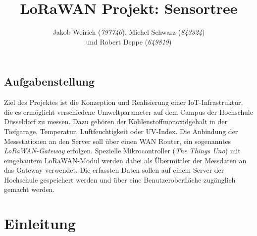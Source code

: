 \documentclass{article}
\title{LoRaWAN Projekt: Sensortree}
\author{Jakob Weirich (\textit{797740}), Michel Schwarz (\textit{843324}) \\und Robert Deppe (\textit{649819})}
\begin{document}
\setlength{\parindent}{0cm} %
\onehalfspacing
\maketitle
\newpage

\tableofcontents
\newpage

\subsection*{Aufgabenstellung}
Ziel des Projektes ist die Konzeption und Realisierung einer IoT-Infrastruktur, die es ermöglicht verschiedene Umweltparameter auf dem Campus der Hochschule Düsseldorf zu messen.
Dazu gehören der Kohlenstoffmonoxidgehalt in der Tiefgarage, Temperatur, Luftfeuchtigkeit oder UV-Index.
Die Anbindung der Messstationen an den Server soll über einen WAN Router, ein sogenanntes \textit{LoRaWAN-Gateway} erfolgen.
Spezielle Mikrocontroller (\textit{The Things Uno}) mit eingebautem LoRaWAN-Modul werden dabei als Übermittler der Messdaten an das Gateway verwendet. Die erfassten Daten sollen auf einem Server der Hochschule gespeichert werden und über eine Benutzeroberfläche zugänglich gemacht werden.




\newpage

\setcounter{page}{1}

\section{Einleitung}
\end{document}
